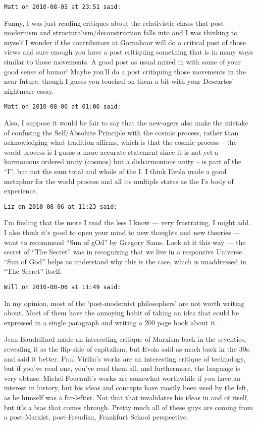 \begin{footnotesize}\begin{sffamily}



\texttt{Matt on 2010-08-05 at 23:51 said: }

Funny, I was just reading critiques about the relativistic chaos that post-modernism and structuralism/deconstruction falls into and I was thinking to myself I wonder if the contributors at Gornahoor will do a critical post of those views and sure enough you have a post critiquing something that is in many ways similar to those movements. A good post as usual mixed in with some of your good sense of humor! Maybe you'll do a post critiquing those movements in the near future, though I guess you touched on them a bit with your Descartes' nightmare essay.


\hfill

\texttt{Matt on 2010-08-06 at 01:06 said: }

Also, I suppose it would be fair to say that the new-agers also make the mistake of confusing the Self/Absolute Principle with the cosmic process, rather than acknowledging what tradition affirms, which is that the cosmic process – the world process is I guess a more accurate statement since it is not yet a harmonious ordered unity (cosmos) but a disharmonious unity – is part of the “I”, but not the sum total and whole of the I. I think Evola made a good metaphor for the world process and all its multiple states as the I's body of experience.


\hfill

\texttt{Liz on 2010-08-06 at 11:23 said: }

I'm finding that the more I read the less I know — very frustrating, I might add. I also think it's good to open your mind to new thoughts and new theories — want to recommend “Sun of gOd” by Gregory Sams. Look at it this way — the secret of “The Secret” was in recognizing that we live in a responsive Universe. “Sun of God” helps us understand why this is the case, which is unaddressed in “The Secret” itself.


\hfill

\texttt{Will on 2010-08-06 at 11:49 said: }

In my opinion, most of the `post-modernist philosophers' are not worth writing about. Most of them have the annoying habit of taking an idea that could be expressed in a single paragraph and writing a 200 page book about it.

Jean Baudrillard made an interesting critique of Marxism back in the seventies, revealing it as the flip-side of capitalism, but Evola said as much back in the 30s, and said it better. Paul Virilio's works are an interesting critique of technology, but if you've read one, you've read them all, and furthermore, the language is very obtuse. Michel Foucault's works are somewhat worthwhile if you have an interest in history, but his ideas and concepts have mostly been used by the left, as he himself was a far-leftist. Not that that invalidates his ideas in and of itself, but it's a bias that comes through. Pretty much all of these guys are coming from a post-Marxist, post-Freudian, Frankfurt School perspective.


\end{sffamily}
\end{footnotesize}
